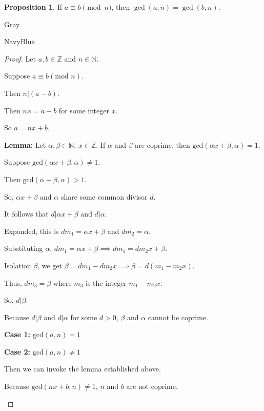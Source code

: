 \documentclass[12pt]{amsart}
\theoremstyle{named}
\newenvironment{prf}
{\medskip\begin{color}{Gray}\begin{framed}\begin{color}{NavyBlue}\begin{proof}[Proof]
\doublespacing}
{\end{proof}\end{color}\end{framed}\end{color}\medskip}
\theoremstyle{definition}
\newtheorem{proposition}{Proposition}
\begin{document}
\begin{proposition}
	If $a\equiv b\pmod n$, then $\gcd(a,n) = \gcd(b,n)$.
\end{proposition}

\begin{prf}
	\phantom{ }

	Let $a,b \in \mathbb Z$ and $n \in \mathbb N$. 

	Suppose $a \equiv b (\text{mod } n)$.

	Then $n|(a-b)$.

	Then $nx = a-b$ for some integer $x$.

	So $a = nx + b$.

	\textbf{Lemma:} Let $\alpha, \beta \in \mathbb N$, $x \in \mathbb Z$. If $\alpha$ and $\beta$ are 
	coprime, then $\text{gcd}(\alpha x+\beta,\alpha) = 1$.

	\begin{adjustwidth}{2em}{0em}		
		Suppose $\text{gcd}(\alpha x+\beta ,\alpha) \neq 1$.

		Then $\text{gcd}(\alpha +\beta ,\alpha) > 1$.

		So, $\alpha x+\beta $ and $\alpha$ share some common divisor $d$.

		It follows that $d|\alpha x+\beta $ and $d|\alpha$.

		Expanded, this is $dm_1 = \alpha x +\beta $ and $dm_2 = \alpha$.

		Substituting $\alpha$, $dm_1 = \alpha x+\beta  \implies dm_1 = dm_2x+\beta $.

		Isolation $\beta $, we get $\beta  = dm_1 - dm_2x \implies \beta  = d(m_1-m_2x)$.

		Thus, $dm_3 = \beta $ where $m_3$ is the integer $m_1-m_2x$.

		So, $d|\beta $. 

		Because $d|\beta $ and $d|\alpha$ for some $d > 0$, $\beta$ and $\alpha$ cannot
		be coprime.
	\end{adjustwidth}

	\textbf{Case 1:} $\text{gcd}(a,n) = 1$
	\begin{adjustwidth}{2em}{0em}

	\end{adjustwidth}

	\textbf{Case 2:} $\text{gcd}(a,n) \neq 1$
	\begin{adjustwidth}{2em}{0em}
		Then we can invoke the lemma established above.

		Because $\text{gcd}(nx+b,n) \neq 1$, $n$ and $b$ are not coprime. 


\end{adjustwidth}
\end{prf}
\end{document}
